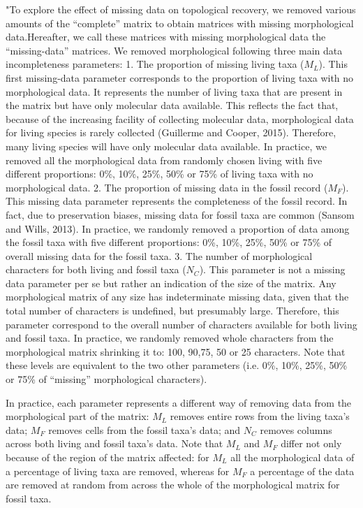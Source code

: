 \documentclass[12pt,letterpaper]{article}
\begin{document}
\begin{enumerate}
"To explore the effect of missing data on topological recovery, we removed various amounts of the “complete” matrix to obtain matrices with missing morphological data.Hereafter, we call these matrices with missing morphological data the “missing-data” matrices. We removed morphological following three main data incompleteness parameters:
1. The proportion of missing living taxa ($M_L$). This first missing-data parameter corresponds to the proportion of living taxa with no morphological data. It represents the number of living taxa that are present in the matrix but have only molecular data available. This reflects the fact that, because of the increasing facility of collecting molecular data, morphological data for living species is rarely collected (Guillerme and Cooper, 2015). Therefore, many living species will have only molecular data available. In practice, we removed all the morphological data from randomly chosen living with five different proportions: 0\%, 10\%, 25\%, 50\% or 75\% of living taxa with no morphological data.
2. The proportion of missing data in the fossil record ($M_F$). This missing data parameter represents the completeness of the fossil record. In fact, due to preservation biases, missing data for fossil taxa are common (Sansom and Wills, 2013). In practice, we randomly removed a proportion of data among the fossil taxa with five different proportions: 0\%, 10\%, 25\%, 50\% or 75\% of overall missing data for the fossil taxa.
3. The number of morphological characters for both living and fossil taxa ($N_C$). This parameter is not a missing data parameter per se but rather an indication of the size of the matrix. Any morphological matrix of any size has indeterminate missing data, given that the total number of characters is undefined, but presumably large. Therefore, this parameter correspond to the overall number of characters available for both living and fossil taxa. In practice, we randomly removed whole characters from the morphological matrix shrinking it to: 100, 90,75, 50 or 25 characters.
Note that these levels are equivalent to the two other parameters (i.e. 0\%, 10\%, 25\%, 50\% or 75\% of “missing” morphological characters).

In practice, each parameter represents a different way of removing data from the morphological part of the matrix: $M_L$ removes entire rows from the living taxa’s data; $M_F$ removes cells from the fossil taxa’s data; and $N_C$ removes columns across both living and fossil taxa’s data. Note that $M_L$  and $M_F$ differ not only because of the region of the matrix affected: for $M_L$ all the morphological data of a percentage of living taxa are removed, whereas for $M_F$ a percentage of the data are removed at random from across the whole of the morphological matrix for fossil taxa.


\end{enumerate}
\end{document}
